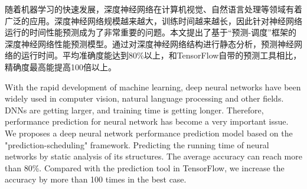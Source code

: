 
\begin{cabstract}
    随着机器学习的快速发展，深度神经网络在计算机视觉、自然语言处理等领域有着广泛的应用。深度神经网络规模越来越大，训练时间越来越长，因此针对神经网络运行的时间性能预测成为了非常重要的问题。本文提出了基于“预测-调度”框架的深度神经网络性能预测模型。通过对深度神经网络结构进行静态分析，预测神经网络的运行时间。平均准确度能达到80\%以上，和TensorFlow自带的预测工具相比，精确度最高能提高100倍以上。

\end{cabstract}


\begin{eabstract}
    With the rapid development of machine learning, deep neural networks have been widely used in computer vision, natural language processing and other fields. DNNs are getting larger, and training time is getting longer. Therefore, performance prediction for neural network has become a very important issue. We proposes a deep neural network performance prediction model based on the "prediction-scheduling" framework. Predicting the running time of neural networks by static analysis of its structures. The average accuracy can reach more than 80\%. Compared with the prediction tool in TensorFlow, we increase the accuracy by more than 100 times in the best case.
\end{eabstract}

